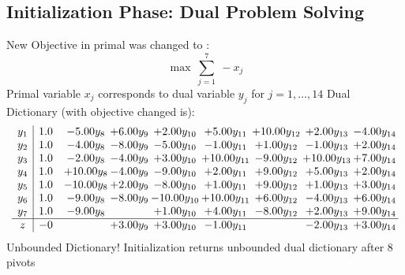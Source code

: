\documentclass[9pt]{article}
\begin{document}
\subsection{Initialization Phase: Dual Problem Solving}
New Objective in primal was changed to : \[ \max\ \sum_{j=1}^{7}\ - x_j \] 
Primal variable $x_j$ corresponds to dual variable $y_j$ for $j = 1,\ldots,14$
Dual Dictionary (with objective changed is): 
\[\begin{array}{c| c c@{\hskip 2pt} c@{\hskip 2pt} c@{\hskip 2pt} c@{\hskip 2pt} c@{\hskip 2pt} c@{\hskip 2pt} c@{\hskip 2pt} }
 y_{1}   &  1.0 & -5.00 y_{8} & +  6.00 y_{9} & +  2.00 y_{10} & +  5.00 y_{11} & + 10.00 y_{12} & +  2.00 y_{13} & -4.00 y_{14}\\
 y_{2}   &  1.0 & -4.00 y_{8} & -8.00 y_{9} & -5.00 y_{10} & -1.00 y_{11} & +  1.00 y_{12} & -1.00 y_{13} & +  2.00 y_{14}\\
 y_{3}   &  1.0 & -2.00 y_{8} & -4.00 y_{9} & +  3.00 y_{10} & + 10.00 y_{11} & -9.00 y_{12} & + 10.00 y_{13} & +  7.00 y_{14}\\
 y_{4}   &  1.0 & + 10.00 y_{8} & -4.00 y_{9} & -9.00 y_{10} & +  2.00 y_{11} & +  9.00 y_{12} & +  5.00 y_{13} & +  2.00 y_{14}\\
 y_{5}   &  1.0 & -10.00 y_{8} & +  2.00 y_{9} & -8.00 y_{10} & +  1.00 y_{11} & +  9.00 y_{12} & +  1.00 y_{13} & +  3.00 y_{14}\\
 y_{6}   &  1.0 & -9.00 y_{8} & -8.00 y_{9} & -10.00 y_{10} & + 10.00 y_{11} & +  6.00 y_{12} & -4.00 y_{13} & +  6.00 y_{14}\\
 y_{7}   &  1.0 & -9.00 y_{8} &   & +  1.00 y_{10} & +  4.00 y_{11} & -8.00 y_{12} & +  2.00 y_{13} & +  9.00 y_{14}\\
\hline
z    &  -0  &   & +  3.00 y_{9} & +  3.00 y_{10} & -1.00 y_{11} &   & -2.00 y_{13} & +  3.00 y_{14}\\
\end{array}\]
Unbounded Dictionary!
Initialization returns unbounded dual dictionary after 8 pivots
\end{document}
